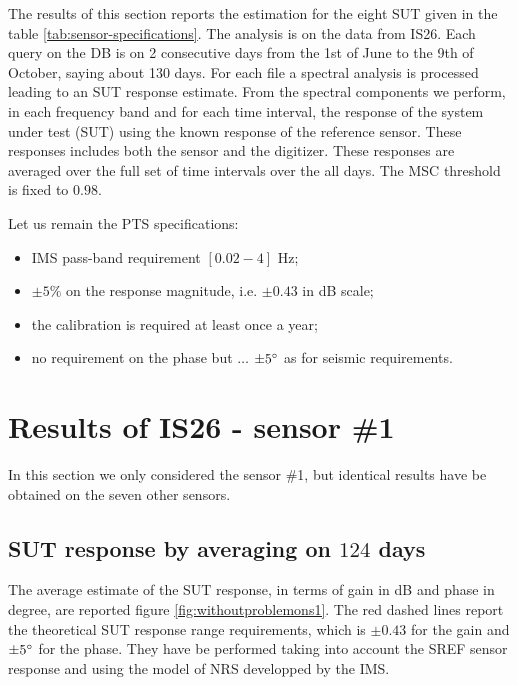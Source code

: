 The results of this section reports the estimation for the eight SUT given in the table \ref{tab:sensor-specifications}.
The analysis is on the data from IS26. Each query on the DB is on 2 consecutive days from the 1st of June to the 9th of October, saying about 130 days. For each file a spectral analysis is processed leading to an SUT response estimate. From the spectral components we perform, in each frequency band and for each time interval, the response of the system under test (SUT) using the known response of the reference sensor. These responses includes both the sensor and the digitizer. These responses are averaged over the full set of time intervals over the all days. The  MSC threshold is fixed to $0.98$. 

Let us remain the PTS specifications:
\begin{itemize}
\item
IMS pass-band requirement $[0.02 - 4]$ Hz;
 \item
$\pm 5\%$ on the response magnitude, i.e. $\pm 0.43$ in dB scale;
\item
the calibration is required at least once a year;
 \item
no requirement  on the phase but $\ldots$ $\pm 5^{\circ}$ as for seismic requirements.
\end{itemize}


 \newpage
\section{Results of IS26 - sensor \#1}
In this section we only considered the sensor \#1, but identical results have be obtained on the seven other sensors.


\subsection{SUT response by averaging on $124$ days}
The average estimate of the SUT response, in terms of gain in dB and phase in degree, are reported figure \ref{fig:withoutproblemons1}. The red dashed lines report the theoretical SUT response range requirements, which is $\pm 0.43$ for the gain and $\pm 5^{\circ}$ for the phase. They have be performed taking into account the SREF sensor response and using the model of NRS developped by the IMS.

